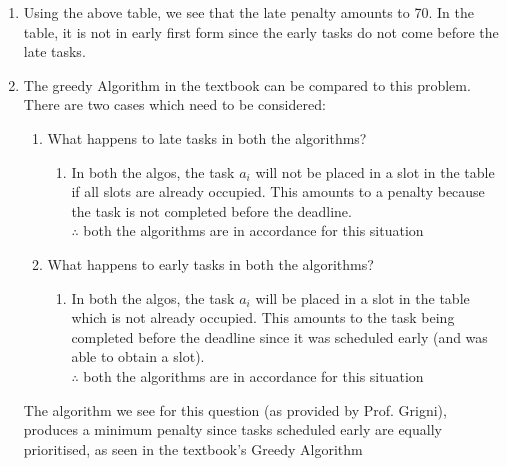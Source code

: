 \documentclass[11pt]{article}
\begin{document}
\begin{enumerate}
\begin{center}
    \begin{enumerate}
        \item Using the above table, we see that the late penalty amounts to 70. In the table, it is not in early first form since the early tasks do not come before the late tasks.
        
        \item The greedy Algorithm in the textbook can be compared to this problem. There are two cases which need to be considered:
        
        \begin{enumerate}
            \item What happens to late tasks in both the algorithms?
                \begin{enumerate}
                    \item In both the algos, the task $a_i$ will not be placed in a slot in the table if all slots are already occupied. This amounts to a penalty because the task is not completed before the deadline.\\
                    $\therefore$ both the algorithms are in accordance for this situation
                \end{enumerate}
            \item What happens to early tasks in both the algorithms?
                \begin{enumerate}
                    \item In both the algos, the task $a_i$ will be placed in a slot in the table which is not already occupied. This amounts to the task being completed before the deadline since it was scheduled early (and was able to obtain a slot).\\
                    $\therefore$ both the algorithms are in accordance for this situation
                \end{enumerate}
        \end{enumerate}
        The algorithm we see for this question (as provided by Prof. Grigni), produces a minimum penalty since tasks scheduled early are equally prioritised, as seen in the textbook's Greedy Algorithm
        
    \end{enumerate}
    
\end{center}
\pagebreak


\end{enumerate}
\end{document}
